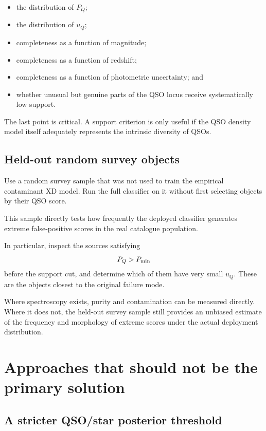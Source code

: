 \documentclass[11pt]{article}
\begin{document}
\begin{itemize}
\item the distribution of $P_Q$;
\item the distribution of $u_Q$;
\item completeness as a function of magnitude;
\item completeness as a function of redshift;
\item completeness as a function of photometric uncertainty; and
\item whether unusual but genuine parts of the QSO locus receive
systematically low support.
\end{itemize}

The last point is critical. A support criterion is only useful if the QSO
density model itself adequately represents the intrinsic diversity of QSOs.

\subsection{Held-out random survey objects}

Use a random survey sample that was not used to train the empirical
contaminant XD model. Run the full classifier on it without first selecting
objects by their QSO score.

This sample directly tests how frequently the deployed classifier generates
extreme false-positive scores in the real catalogue population.

In particular, inspect the sources satisfying
%
\begin{equation}
P_Q > P_{\rm min}
\end{equation}
%
before the support cut, and determine which of them have very small $u_Q$.
These are the objects closest to the original failure mode.

Where spectroscopy exists, purity and contamination can be measured directly.
Where it does not, the held-out survey sample still provides an unbiased
estimate of the frequency and morphology of extreme scores under the actual
deployment distribution.

\section{Approaches that should not be the primary solution}

\subsection{A stricter QSO/star posterior threshold}
\end{document}
